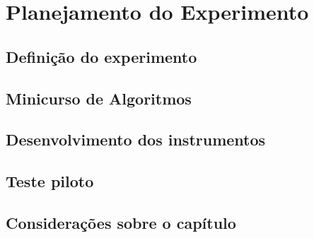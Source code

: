 \chapter{Planejamento do Experimento}

\section{Definição do experimento}

\section{Minicurso de Algoritmos}

\section{Desenvolvimento dos instrumentos}

\section{Teste piloto}

\section{Considerações sobre o capítulo}
